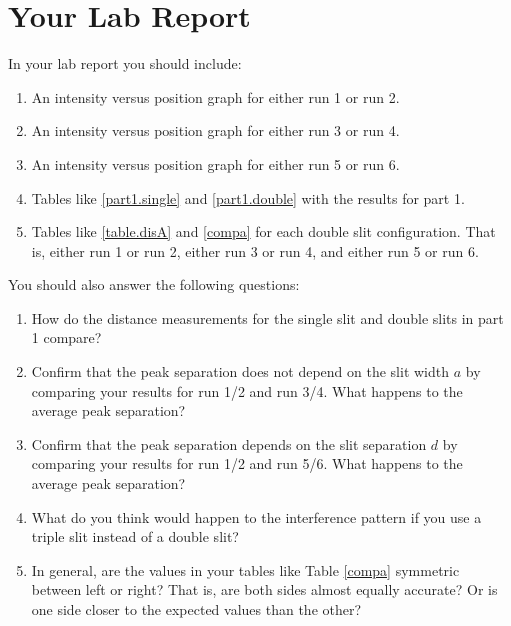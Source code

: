 \section{Your Lab Report}
In your lab report you should include:
\begin{enumerate}
	\item An intensity versus position graph for either run 1 or run 2.
	\item An intensity versus position graph for either run 3 or run 4.
	\item An intensity versus position graph for either run 5 or run 6.
	\item Tables like \ref{part1.single} and \ref{part1.double} with the results for part 1.
	\item Tables like \ref{table.disA} and \ref{compa} for each double slit configuration. That is, either run 1 or run 2, either run 3 or run 4, and either run 5 or run 6. 
\end{enumerate}
You should also answer the following questions:
\begin{enumerate}
	\item How do the distance measurements for the single slit and double slits in part 1 compare?
	\item Confirm that the peak separation does not depend on the slit width $a$ by comparing your results for run 1/2 and run 3/4. What happens to the average peak separation?
	\item Confirm that the peak separation depends on the slit separation $d$ by comparing your results for run 1/2 and run 5/6. What happens to the average peak separation?
	\item What do you think would happen to the interference pattern if you use a triple slit instead of a double slit?
	\item In general, are the values in your tables like Table \ref{compa} symmetric between left or right? That is, are both sides almost equally accurate? Or is one side closer to the expected values than the other?
\end{enumerate}